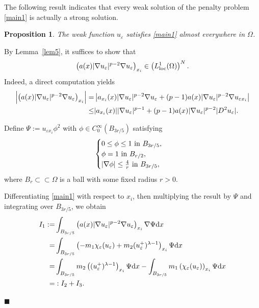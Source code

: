 \documentclass[onecolumn]{autart}
\newtheorem{proposition}{Proposition}
\newenvironment{proof}{{\it Proof: \enspace}}{\hfill $\blacksquare$\par}
\begin{document}
	
	
	The following result indicates that every weak solution   of the penalty problem  \eqref{main1} is actually a strong solution.
	\begin{proposition}\label{a.e.}
		The weak function $u_\varepsilon$ satisfies \eqref{main1} almost everywhere in $\Omega$.
	\end{proposition}
	
	
	\begin{proof}
		By Lemma~\ref{lem5}, it suffices to show that
		\begin{align}
			\left( a(x) |\nabla u_\varepsilon|^{p-2} \nabla u_\varepsilon \right) _{x_i}\in \left( L^1_{\mathrm{loc}}(\Omega)\right) ^N.\notag
		\end{align}
		Indeed, a direct computation yields
		\begin{align}
			\left| \left( a(x) |\nabla u_\varepsilon|^{p-2} \nabla u_\varepsilon \right)_{x_i} \right|
			=
			& \left| a_{x_i}(x) |\nabla u_\varepsilon|^{p-2} \nabla u_\varepsilon +(p-1) a(x)  |\nabla u_\varepsilon|^{p-2} \nabla u_{\varepsilon x_i}\right|
			\notag\\ \leq
			& |a_{x_i}(x)| |\nabla u_\varepsilon|^{p-1}  + (p-1) a(x) |\nabla u_\varepsilon|^{p-2} |D^2 u_\varepsilon|.\label{5.3}
		\end{align}
		
		Define $\Psi:=u_{\varepsilon x_{i}}\phi^{2}$ with $\phi\in C^{\infty}_{0}(B_{3r/5})$ satisfying
		\begin{align}
			\begin{cases}
				0\leq\phi\leq 1  \text{ in } B_{3r/5}, \\
				\phi=1           \text{ in } B_{r/2}, \\
				|\nabla\phi|\leq\frac{4}{r}  \text{ in } B_{3r/5},
			\end{cases}\notag
		\end{align}
		where $B_{r}\subset \subset\Omega$ is a ball with some fixed radius $r>0$.
		
		Differentiating \eqref{main1} with respect to $x_i$, then multiplying the result by $\Psi$ and integrating over $B_{3r/5}$, we obtain
		\begin{align}
			I_1 := &\int_{B_{3r/5}} \left( a(x) |\nabla u_\varepsilon|^{p-2} \nabla u_\varepsilon \right)_{x_i}  \nabla \Psi  \mathrm{d}x
			\notag \\ =
			& \int_{B_{3r/5}} \left( -m_1 \chi_\varepsilon(u_\varepsilon) + m_2 (u_\varepsilon^+)^{\lambda-1} \right)_{x_i} \Psi  \mathrm{d}x
			\notag \\ =
			& \int_{B_{3r/5}} m_2\left( (u_\varepsilon^+)^{\lambda-1} \right)_{x_i} \Psi  \mathrm{d}x -\int_{B_{3r/5}} m_1 \left( \chi_\varepsilon(u_\varepsilon) \right)_{x_i} \Psi  \mathrm{d}x
			\notag \\ =
			&: I_2 + I_3. \label{5.5}
		\end{align}
		

\end{proof}
\end{document}
